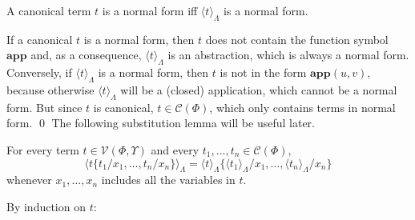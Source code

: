 \documentclass{LMCS}
\newcommand{\varone}{x}
\newcommand{\termone}{t}
\newcommand{\termtwo}{u}
\newcommand{\termthree}{v}
\newcommand{\appTRS}{\mathbf{app}}
\newcommand{\TRStolambda}[1]{\langle{#1}\rangle_{\Lambdaterms}}
\newcommand{\Variables}{\Upsilon}
\newcommand{\Lambdaterms}{\Lambda}
\newcommand{\TRSvarterms}{\mathcal{V}(\Phi,\Variables)}
\newcommand{\TRSconterms}{\mathcal{C}(\Phi)}
\begin{document}
\begin{lem}\label{lemma:NFcanonical}
A canonical term $\termone$ is a normal form iff 
$\TRStolambda{\termone}$ is a normal form.
\end{lem}
\proof
If a canonical $\termone$ is a normal form, then $\termone$ does not contain the function symbol $\appTRS$ and,
as a consequence, $\TRStolambda{\termone}$ is an abstraction, which is always a normal form.
Conversely, if $\TRStolambda{\termone}$ is a normal form, then
$\termone$ is not in the form $\appTRS(\termtwo,\termthree)$, because otherwise
$\TRStolambda{\termone}$ will be a (closed) application, which cannot be a normal form.
But since $\termone$ is canonical, $\termone\in\TRSconterms$, which only contains terms
in normal form.
\qed
The following substitution lemma will be useful later.
\begin{lem}[Substitution]
For every term $\termone\in\TRSvarterms$ and every $\termone_1,\ldots,\termone_n\in\TRSconterms$,
$$
\TRStolambda{\termone\{\termone_1/\varone_1,\ldots,\termone_n/\varone_n\}}=
\TRStolambda{\termone}\{\TRStolambda{\termone_1}/\varone_1,\ldots,\TRStolambda{\termone_n}/\varone_n\}
$$
whenever $\varone_1,\ldots,\varone_n$ includes all the variables in $\termone$.
\end{lem}
\proof
By induction on $\termone$:
\end{document}
